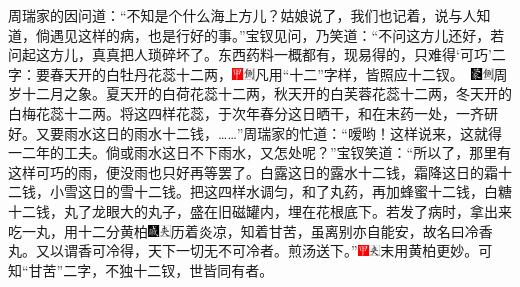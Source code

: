 周瑞家的因问道：“不知是个什么海上方儿？姑娘说了，我们也记着，说与人知道，倘遇见这样的病，也是行好的事。”宝钗见问，乃笑道：“不问这方儿还好，若问起这方儿，真真把人琐碎坏了。东西药料一概都有，现易得的，只难得‘可巧’二字：要春天开的白牡丹花蕊十二两，{{\includegraphics[width=3mm]{../Images/00002}\includegraphics[width=3mm]{../Images/00011}\footnotesize \kaishu 凡用“十二”字样，皆照应十二钗。　}\includegraphics[width=3mm]{../Images/00006}\includegraphics[width=3mm]{../Images/00011}\footnotesize \kaishu 周岁十二月之象。}夏天开的白荷花蕊十二两，秋天开的白芙蓉花蕊十二两，冬天开的白梅花蕊十二两。将这四样花蕊，于次年春分这日晒干，和在末药一处，一齐研好。又要雨水这日的雨水十二钱，\ldots{}\ldots{}”周瑞家的忙道：“嗳哟！这样说来，这就得一二年的工夫。倘或雨水这日不下雨水，又怎处呢？”宝钗笑道：“所以了，那里有这样可巧的雨，便没雨也只好再等罢了。白露这日的露水十二钱，霜降这日的霜十二钱，小雪这日的雪十二钱。把这四样水调匀，和了丸药，再加蜂蜜十二钱，白糖十二钱，丸了龙眼大的丸子，盛在旧磁罐内，埋在花根底下。若发了病时，拿出来吃一丸，用十二分黄柏{\includegraphics[width=3mm]{../Images/00005}\includegraphics[width=3mm]{../Images/00012}\footnotesize \kaishu 历着炎凉，知着甘苦，虽离别亦自能安，故名曰冷香丸。又以谓香可冷得，天下一切无不可冷者。}煎汤送下。”{\includegraphics[width=3mm]{../Images/00002}\includegraphics[width=3mm]{../Images/00012}\footnotesize \kaishu 末用黄柏更妙。可知“甘苦”二字，不独十二钗，世皆同有者。}

